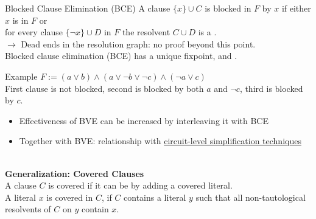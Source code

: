 \documentclass[t]{sdqbeamer}
\begin{document}
    
\begin{frame}{Blocked Clause Elimination (BCE)}
A clause $\{ x \} \cup C$ is blocked in $F$ by $x$ if either $x$ is  in $F$ or \\
for every clause $\{ \lnot x \} \cup D$ in $F$ the resolvent $C \cup D$ is a .\\[1ex]
$\rightarrow$ Dead ends in the resolution graph: no proof beyond this point.\\[1ex]
Blocked clause elimination (BCE) has a unique fixpoint, and .\\[1ex]
\begin{exampleblock}{Example}
$F := (a \lor b) \land (a \lor \lnot b \lor \lnot c) \land (\lnot a \lor c)$\\[1ex]
First clause is not blocked, second is blocked by both $a$ and $\lnot c$, third is blocked by $c$.\\[1ex]
\end{exampleblock}
\pause
\begin{itemize}\setlength{\itemsep}{1ex}
    \item Effectiveness of BVE can be increased by interleaving it with BCE
    \item Together with BVE: relationship with \href{https://doi.org/10.1007/s10817-011-9239-9}{circuit-level simplification techniques}
\end{itemize}~\\
\pause
\textbf{Generalization: Covered Clauses}\\
A clause $C$ is covered if it can be  by adding a covered literal.\\
A literal $x$ is covered in $C$, if $C$ contains a literal $y$ such that all non-tautological resolvents of $C$ on $y$ contain $x$.
\end{frame}
\end{document}
